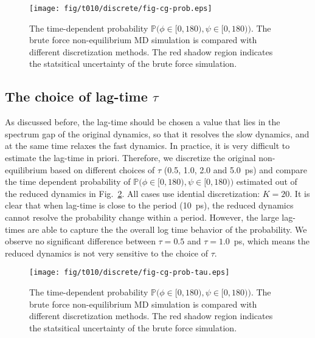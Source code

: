 \documentclass[aps, pre, preprint,unsortedaddress,a4paper,onecolumn]{revtex4}
\begin{document}
\begin{figure}
  \centering
  \texttt{[image: fig/t010/discrete/fig-cg-prob.eps]}  
  \caption{The time-dependent probability $\mathbb
    P\big(\phi\in[0,180), \psi\in [0,180)\big)$.  The brute force
    non-equilibrium MD simulation is compared with different
    discretization methods. The red shadow region indicates the
    statsitical uncertainty of the brute force simulation.}
  \label{fig:tmp2}
\end{figure}


\subsection{The choice of lag-time $\tau$}

As discussed before, the lag-time should be chosen a value that lies
in the spectrum gap of the original dynamics, so that it resolves the
slow dynamics, and at the same time relaxes the fast dynamics. In
practice, it is very difficult to estimate the lag-time in
priori. Therefore, we discretize the original non-equilibrium based on
different choices of $\tau$ (0.5, 1.0, 2.0 and 5.0~ps) and compare the
time dependent probability of $\mathbb P\big(\phi\in[0,180), \psi\in
[0,180)\big)$ estimated out of the reduced dynamics in
Fig.~\ref{fig:tmp3}.  All cases use idential discretization: $K=20$.
It is clear that when lag-time is close to the period (10~ps), the
reduced dynamics cannot resolve the probability change within a
period. However, the large lag-times are able to capture the
the overall log time behavior of the probability.
We observe no significant difference between $\tau=0.5$ and
$\tau=1.0$~ps, which means the reduced dynamics is not very sensitive
to the choice of $\tau$. 


\begin{figure}
  \centering
  \texttt{[image: fig/t010/discrete/fig-cg-prob-tau.eps]}  
  \caption{The time-dependent probability $\mathbb
    P\big(\phi\in[0,180), \psi\in [0,180)\big)$.  The brute force
    non-equilibrium MD simulation is compared with different
    discretization methods. The red shadow region indicates the
    statsitical uncertainty of the brute force simulation.}
  \label{fig:tmp3}
\end{figure}
\end{document}
